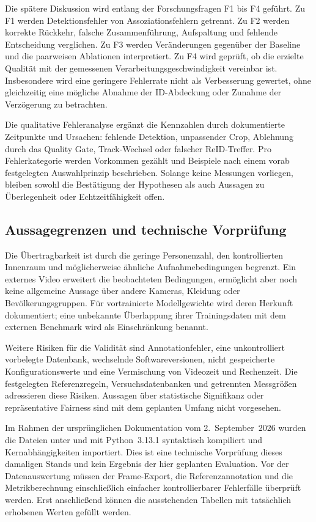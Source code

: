 \documentclass[runningheads]{llncs}
\begin{document}
Die spätere Diskussion wird entlang der Forschungsfragen F1 bis F4 geführt. Zu F1 werden Detektionsfehler von Assoziationsfehlern getrennt. Zu F2 werden korrekte Rückkehr, falsche Zusammenführung, Aufspaltung und fehlende Entscheidung verglichen. Zu F3 werden Veränderungen gegenüber der Baseline und die paarweisen Ablationen interpretiert. Zu F4 wird geprüft, ob die erzielte Qualität mit der gemessenen Verarbeitungsgeschwindigkeit vereinbar ist. Insbesondere wird eine geringere Fehlerrate nicht als Verbesserung gewertet, ohne gleichzeitig eine mögliche Abnahme der ID-Abdeckung oder Zunahme der Verzögerung zu betrachten.

Die qualitative Fehleranalyse ergänzt die Kennzahlen durch dokumentierte Zeitpunkte und Ursachen: fehlende Detektion, unpassender Crop, Ablehnung durch das Quality Gate, Track-Wechsel oder falscher ReID-Treffer. Pro Fehlerkategorie werden Vorkommen gezählt und Beispiele nach einem vorab festgelegten Auswahlprinzip beschrieben. Solange keine Messungen vorliegen, bleiben sowohl die Bestätigung der Hypothesen als auch Aussagen zu Überlegenheit oder Echtzeitfähigkeit offen.

\subsection{Aussagegrenzen und technische Vorprüfung}

Die Übertragbarkeit ist durch die geringe Personenzahl, den kontrollierten Innenraum und möglicherweise ähnliche Aufnahmebedingungen begrenzt. Ein externes Video erweitert die beobachteten Bedingungen, ermöglicht aber noch keine allgemeine Aussage über andere Kameras, Kleidung oder Bevölkerungsgruppen. Für vortrainierte Modellgewichte wird deren Herkunft dokumentiert; eine unbekannte Überlappung ihrer Trainingsdaten mit dem externen Benchmark wird als Einschränkung benannt.

Weitere Risiken für die Validität sind Annotationfehler, eine unkontrolliert vorbelegte Datenbank, wechselnde Softwareversionen, nicht gespeicherte Konfigurationswerte und eine Vermischung von Videozeit und Rechenzeit. Die festgelegten Referenzregeln, Versuchsdatenbanken und getrennten Messgrößen adressieren diese Risiken. Aussagen über statistische Signifikanz oder repräsentative Fairness sind mit dem geplanten Umfang nicht vorgesehen.

Im Rahmen der ursprünglichen Dokumentation vom 2.~September~2026 wurden die Dateien unter  und  mit Python~3.13.1 syntaktisch kompiliert und Kernabhängigkeiten importiert. Dies ist eine technische Vorprüfung dieses damaligen Stands und kein Ergebnis der hier geplanten Evaluation. Vor der Datenauswertung müssen der Frame-Export, die Referenzannotation und die Metrikberechnung einschließlich einfacher kontrollierbarer Fehlerfälle überprüft werden. Erst anschließend können die ausstehenden Tabellen mit tatsächlich erhobenen Werten gefüllt werden.
\end{document}
